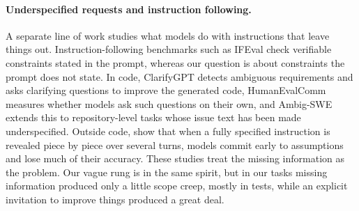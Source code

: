 \paragraph{Underspecified requests and instruction following.}
A separate line of work studies what models do with instructions that leave
things out. Instruction-following benchmarks such as IFEval
\citep{zhou2023instructionfollowing} check verifiable constraints stated in
the prompt, whereas our question is about constraints the prompt does not
state. In code, ClarifyGPT \citep{mu2023clarifygpt} detects ambiguous requirements
and asks clarifying questions to improve the generated code, HumanEvalComm
\citep{wu2025humanevalcomm} measures whether models ask such questions on
their own, and Ambig-SWE \citep{vijayvargiya2026ambigswe} extends
this to repository-level tasks whose issue text has been made underspecified.
Outside code, \citet{laban2026llms} show that when a fully specified
instruction is revealed piece by piece over several turns, models commit
early to assumptions and lose much of their accuracy.
These studies treat the missing information as the problem. Our vague rung is
in the same spirit, but in our tasks missing information produced only a
little scope creep, mostly in tests, while an explicit invitation to improve
things produced a great deal.
